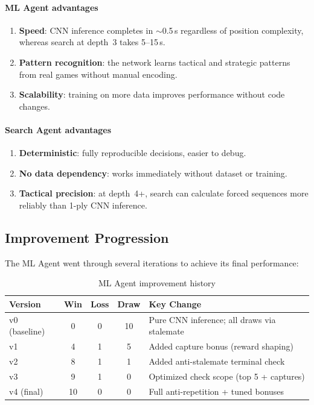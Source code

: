 \documentclass[a4paper,12pt]{article}
\begin{document}
\paragraph{ML Agent advantages}
\begin{enumerate}
    \item \textbf{Speed}: CNN inference completes in $\sim$0.5\,s regardless of position complexity, whereas search at depth~3 takes 5--15\,s.
    \item \textbf{Pattern recognition}: the network learns tactical and strategic patterns from real games without manual encoding.
    \item \textbf{Scalability}: training on more data improves performance without code changes.
\end{enumerate}

\paragraph{Search Agent advantages}
\begin{enumerate}
    \item \textbf{Deterministic}: fully reproducible decisions, easier to debug.
    \item \textbf{No data dependency}: works immediately without dataset or training.
    \item \textbf{Tactical precision}: at depth~4+, search can calculate forced sequences more reliably than 1-ply CNN inference.
\end{enumerate}

\subsection{Improvement Progression}

The ML Agent went through several iterations to achieve its final performance:

\begin{table}[H]
\centering
\caption{ML Agent improvement history}
\begin{tabular}{@{}lcccP{55mm}@{}}
\toprule
\textbf{Version} & \textbf{Win} & \textbf{Loss} & \textbf{Draw} & \textbf{Key Change} \\
\midrule
v0 (baseline) & 0 & 0 & 10 & Pure CNN inference; all draws via stalemate \\
v1 & 4 & 1 & 5 & Added capture bonus (reward shaping) \\
v2 & 8 & 1 & 1 & Added anti-stalemate terminal check \\
v3 & 9 & 1 & 0 & Optimized check scope (top 5 + captures) \\
v4 (final) & 10 & 0 & 0 & Full anti-repetition + tuned bonuses \\
\bottomrule
\end{tabular}
\end{table}
\end{document}
